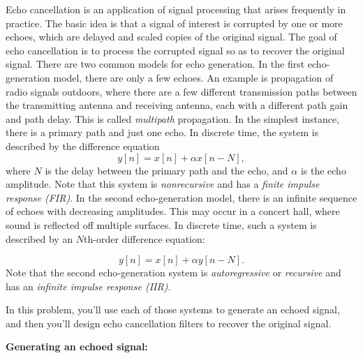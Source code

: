 \documentclass[12pt]{report}
\begin{document}
\vspace{5mm}

Echo cancellation is an application of signal processing that arises frequently in practice. The basic idea is that a signal of interest is corrupted by one or more echoes, which are delayed and scaled copies of the original signal. The goal of echo cancellation is to process the corrupted signal so as to recover the original signal.
\vspace{1.5mm}
There are two common models for echo generation. In the first echo-generation model, there are only a few echoes. An example is propagation of radio signals outdoors, where there are a few different transmission paths between the transmitting antenna and receiving antenna, each with a different path gain and path delay. This is called \textit{multipath} propagation. In the simplest instance, there is a primary path and just one echo. In discrete time, the system is described by the difference equation
\vspace{1.5mm}
\begin{equation}
y[n] = x[n] + \alpha x[n-N],
\end{equation}
where $N$ is the delay between the primary path and the echo, and $\alpha$ is the echo amplitude. Note that this system is \textit{nonrecursive} and has a \textit{finite impulse response (FIR)}.
\vspace{1.5mm}
In the second echo-generation model, there is an infinite sequence of echoes with decreasing amplitudes. This may occur in a concert hall, where sound is reflected off multiple surfaces. In discrete time, such a system is described by an $N$th-order difference equation:

\begin{equation}
y[n] = x[n] + \alpha y[n-N].
\end{equation}                                                           
Note that the second echo-generation system is \textit{autoregressive} or \textit{recursive} and has an \textit{infinite impulse response (IIR)}.

\vspace{2.5mm}
In this problem, you'll use each of those systems to generate an echoed signal, and then you'll design echo cancellation filters to recover the original signal. 

\vspace{3.5mm}

\noindent
\textbf{Generating an echoed signal:}
\end{document}
